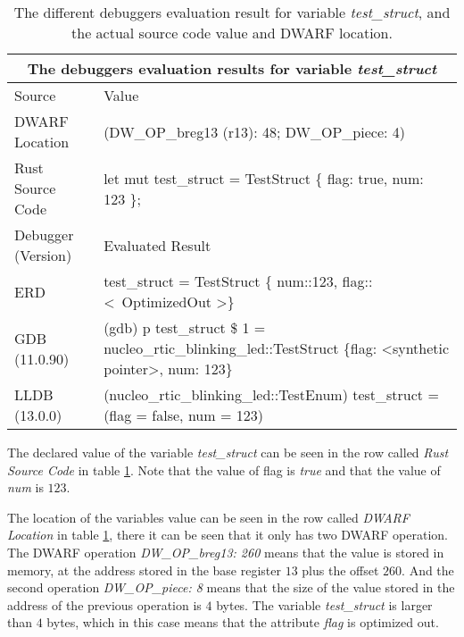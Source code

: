\begin{table}[h]
	\centering
	\small
	\begin{tabular}{ |p{2cm}|p{8cm}|  }
		\hline
		\multicolumn{2}{|c|}{\textbf{The debuggers evaluation results for variable \emph{test\_struct}}} \\ 
		\hline
		\hline
		Source & Value \\
		\hline

		DWARF Location & (DW\_OP\_breg13 (r13): 48; DW\_OP\_piece: 4) \\

		Rust Source Code & let mut test\_struct = TestStruct \{ flag: true, num: 123 \}; \\
		\hline
		\hline
		Debugger (Version) & Evaluated Result \\
		\hline
		ERD & test\_struct = TestStruct \{ num::123, flag::\textless \ OptimizedOut \textgreater \} \\

		GDB (11.0.90)  & (gdb) p test\_struct\newline
		\$ 1 = nucleo\_rtic\_blinking\_led::TestStruct \{flag: \textless synthetic pointer\textgreater, num: 123\} \\

		LLDB (13.0.0) & (nucleo\_rtic\_blinking\_led::TestEnum) test\_struct = (flag = false, num = 123) \\
		\hline
	\end{tabular}
	\caption{The different debuggers evaluation result for variable \emph{test\_struct}, and the actual source code value and DWARF location.}
	\label{table:struct}
\end{table}


The declared value of the variable \emph{test\_struct} can be seen in the row called \emph{Rust Source Code} in table \ref{table:struct}.
Note that the value of flag is \emph{true} and that the value of \emph{num} is $123$.


The location of the variables value can be seen in the row called \emph{DWARF Location} in table \ref{table:struct}, there it can be seen that it only has two \gls{DWARF} operation.
The \gls{DWARF} operation \emph{DW\_OP\_breg13: 260} means that the value is stored in memory, at the address stored in the base register $13$ plus the offset $260$. 
And the second operation \emph{DW\_OP\_piece: 8} means that the size of the value stored in the address of the previous operation is $4$ bytes.
The variable \emph{test\_struct} is larger than $4$ bytes, which in this case means that the attribute \emph{flag} is optimized out.


